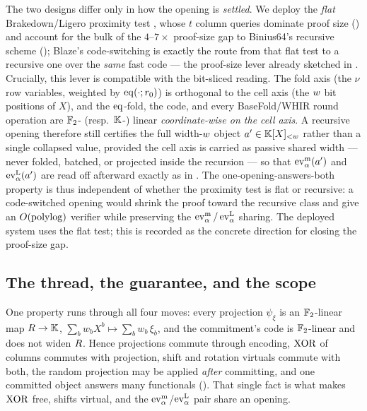 The two designs differ only in how the opening is \emph{settled}. We deploy
the \emph{flat} Brakedown/Ligero proximity test \cite{brakedown}, whose $t$
column queries dominate proof size () and account for
the bulk of the $4$--$7\times$ proof-size gap to Binius64's recursive scheme
(); Blaze's code-switching is exactly the route from that flat
test to a recursive one over the \emph{same} fast code --- the proof-size
lever already sketched in . Crucially, this lever is
compatible with the bit-sliced reading. The fold axis (the $\nu$ row
variables, weighted by $\operatorname{eq}(\cdot;r_0)$) is orthogonal to the cell axis (the
$w$ bit positions of $X$), and the $\operatorname{eq}$-fold, the code, and every
BaseFold/WHIR round operation are $\mathbb{F}_2$- (resp.\ $\mathbb{K}$-) linear
\emph{coordinate-wise on the cell axis}. A recursive opening therefore still
certifies the full width-$w$ object $a'\in\mathbb{K}[X]_{<w}$ rather than a single
collapsed value, provided the cell axis is carried as passive shared width
--- never folded, batched, or projected inside the recursion --- so that
$\operatorname{ev}^{\mathrm{m}}_{\alpha}(a')$ and $\operatorname{ev}^{\mathrm{L}}_{\alpha}(a')$ are read off afterward exactly as in
. The one-opening-answers-both property is thus
independent of whether the proximity test is flat or recursive: a
code-switched opening would shrink the proof toward the recursive class and
give an $O(\operatorname{polylog})$ verifier while preserving the $\operatorname{ev}^{\mathrm{m}}_{\alpha}/\operatorname{ev}^{\mathrm{L}}_{\alpha}$ sharing.
The deployed system uses the flat test; this is recorded as the concrete
direction for closing the proof-size gap.

\subsection{The thread, the guarantee, and the scope}
\label{sec:overview-thread}

One property runs through all four moves: every projection $\psi_\xi$ is an
$\mathbb{F}_2$-linear map $R\to\mathbb{K}$, $\sum_b w_b X^b\mapsto\sum_b
w_b\,\xi_b$, and the commitment's code is $\mathbb{F}_2$-linear and does not widen
$R$. Hence projections commute through encoding, $\operatorname{XOR}$ of columns
commutes with projection, shift and rotation virtuals commute with both,
the random projection may be applied \emph{after} committing, and one
committed object answers many functionals ().
That single fact is what makes $\operatorname{XOR}$ free, shifts virtual, and the
$\operatorname{ev}^{\mathrm{m}}_{\alpha}$/$\operatorname{ev}^{\mathrm{L}}_{\alpha}$ pair share an opening.

